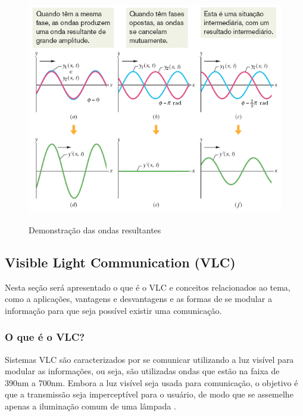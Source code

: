 \begin{figure}[!htbp]
  \caption{Demonstração das ondas resultantes}
  \includegraphics[scale=0.5]{images/ondas_interferencia.png}
  \label{fig:ondas_inter}
\end{figure}


\subsection{Visible Light Communication (VLC)}

Nesta seção será apresentado o que é o VLC e conceitos relacionados ao tema, como a aplicações, vantagens e desvantagens e as formas de se modular a informação para que seja possível existir uma comunicação.

\subsubsection{O que é o VLC?}

Sistemas VLC são caracterizados por se comunicar utilizando a luz visível para modular as informações, ou seja, são utilizadas ondas que estão na faixa de 390nm a 700nm. Embora a luz visível seja usada para comunicação, o objetivo é que a transmissão seja imperceptível para o usuário, de modo que se assemelhe apenas a iluminação comum de uma lâmpada \cite{matheus2017comunicaccao}.

